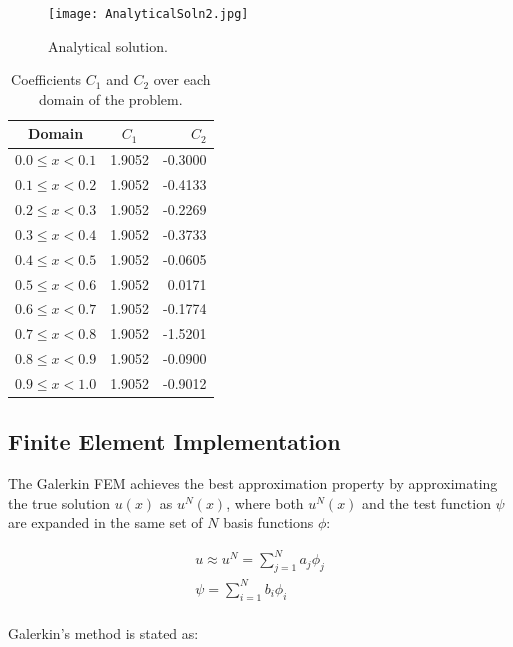 \documentclass[10pt]{article}
\begin{document}
\begin{figure}[H]
\begin{center}  \texttt{[image: AnalyticalSoln2.jpg]}
\caption{Analytical solution.}
\end{center}
\end{figure}

\begin{table}[H]
\caption{Coefficients \(C_1\) and \(C_2\) over each domain of the problem.}
\centering
\begin{tabular}{c c r}
\hline\hline
Domain & \(C_1\) & \(C_2\)\\ [0.5ex]
\hline
\(0.0\leq x< 0.1\) & 1.9052  & -0.3000\\
\(0.1\leq x< 0.2\) & 1.9052  & -0.4133\\
\(0.2\leq x< 0.3\) & 1.9052  & -0.2269 \\
\(0.3\leq x< 0.4\) & 1.9052  & -0.3733\\
\(0.4\leq x< 0.5\) & 1.9052  & -0.0605\\
\(0.5\leq x< 0.6\) & 1.9052  &  0.0171\\
\(0.6\leq x< 0.7\) & 1.9052  & -0.1774\\
\(0.7\leq x< 0.8\) & 1.9052  & -1.5201\\
\(0.8\leq x< 0.9\) & 1.9052  & -0.0900\\
\(0.9\leq x< 1.0\) & 1.9052  & -0.9012\\
\hline
\end{tabular}
\label{table:orders}
\end{table}

\subsection{Finite Element Implementation}

The Galerkin FEM achieves the best approximation property by approximating the true solution \(u(x)\) as \(u^N(x)\), where both \(u^N(x)\) and the test function \(\psi\) are expanded in the same set of \(N\) basis functions \(\phi\):

\begin{equation}
\label{eq:approx}
\begin{aligned}
u\approx u^N=\sum_{j=1}^{N}a_j\phi_j\\
\psi=\sum_{i=1}^{N}b_i\phi_i\\
\end{aligned}
\end{equation}

Galerkin's method is stated as:
\end{document}
